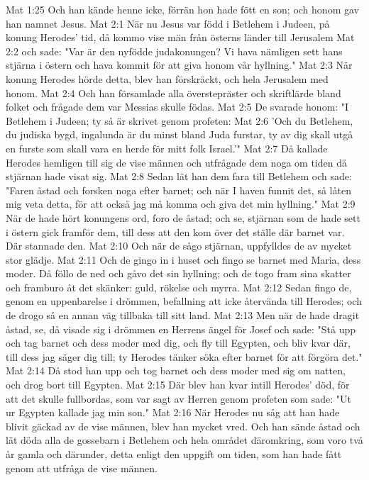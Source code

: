 Mat 1:25  Och han kände henne icke, förrän hon hade fött en son; och honom gav han namnet Jesus.
Mat 2:1  När nu Jesus var född i Betlehem i Judeen, på konung Herodes' tid, då kommo vise män från österns länder till Jerusalem
Mat 2:2  och sade: "Var är den nyfödde judakonungen? Vi hava nämligen sett hans stjärna i östern och hava kommit för att giva honom vår hyllning."
Mat 2:3  När konung Herodes hörde detta, blev han förskräckt, och hela Jerusalem med honom.
Mat 2:4  Och han församlade alla överstepräster och skriftlärde bland folket och frågade dem var Messias skulle födas.
Mat 2:5  De svarade honom: "I Betlehem i Judeen; ty så är skrivet genom profeten:
Mat 2:6  'Och du Betlehem, du judiska bygd, ingalunda är du minst bland Juda furstar, ty av dig skall utgå en furste som skall vara en herde för mitt folk Israel.'"
Mat 2:7  Då kallade Herodes hemligen till sig de vise männen och utfrågade dem noga om tiden då stjärnan hade visat sig.
Mat 2:8  Sedan lät han dem fara till Betlehem och sade: "Faren åstad och forsken noga efter barnet; och när I haven funnit det, så låten mig veta detta, för att också jag må komma och giva det min hyllning."
Mat 2:9  När de hade hört konungens ord, foro de åstad; och se, stjärnan som de hade sett i östern gick framför dem, till dess att den kom över det ställe där barnet var. Där stannade den.
Mat 2:10  Och när de sågo stjärnan, uppfylldes de av mycket stor glädje.
Mat 2:11  Och de gingo in i huset och fingo se barnet med Maria, dess moder. Då föllo de ned och gåvo det sin hyllning; och de togo fram sina skatter och framburo åt det skänker: guld, rökelse och myrra.
Mat 2:12  Sedan fingo de, genom en uppenbarelse i drömmen, befallning att icke återvända till Herodes; och de drogo så en annan väg tillbaka till sitt land.
Mat 2:13  Men när de hade dragit åstad, se, då visade sig i drömmen en Herrens ängel för Josef och sade: "Stå upp och tag barnet och dess moder med dig, och fly till Egypten, och bliv kvar där, till dess jag säger dig till; ty Herodes tänker söka efter barnet för att förgöra det."
Mat 2:14  Då stod han upp och tog barnet och dess moder med sig om natten, och drog bort till Egypten.
Mat 2:15  Där blev han kvar intill Herodes' död, för att det skulle fullbordas, som var sagt av Herren genom profeten som sade: "Ut ur Egypten kallade jag min son."
Mat 2:16  När Herodes nu såg att han hade blivit gäckad av de vise männen, blev han mycket vred. Och han sände åstad och lät döda alla de gossebarn i Betlehem och hela området däromkring, som voro två år gamla och därunder, detta enligt den uppgift om tiden, som han hade fått genom att utfråga de vise männen.
